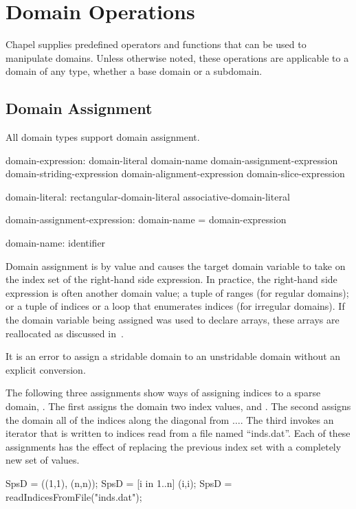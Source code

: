 \section{Domain Operations}

Chapel supplies predefined operators and functions that can be used to manipulate
domains.  Unless otherwise noted, these operations are applicable to a domain of
any type, whether a base domain or a subdomain.

\subsection{Domain Assignment}
\label{Domain_Assignment}

All domain types support domain assignment.  

\begin{syntax}
domain-expression:
  domain-literal
  domain-name
  domain-assignment-expression
  domain-striding-expression
  domain-alignment-expression
  domain-slice-expression

domain-literal:
  rectangular-domain-literal
  associative-domain-literal

domain-assignment-expression:
  domain-name = domain-expression

domain-name:
  identifier
\end{syntax}

Domain assignment is by
value and causes the target domain variable to take on the index set
of the right-hand side expression.  In practice, the right-hand side
expression is often another domain value; a tuple of ranges (for
regular domains); or a tuple of indices or a loop that enumerates
indices (for irregular domains).  If the domain variable being
assigned was used to declare arrays, these arrays are reallocated as
discussed in~.

It is an error to assign a stridable domain to an unstridable domain
without an explicit conversion.

\begin{example}
The following three assignments show ways of assigning indices to a
sparse domain, .  The first assigns the domain two index
values,  and .  The second assigns the domain
all of the indices along the diagonal from
$\ldots$.  The third invokes an iterator that
is written to  indices read from a file named
``inds.dat''.  Each of these assignments has the effect of replacing
the previous index set with a completely new set of values.
\begin{chapel}
SpsD = ((1,1), (n,n));
SpsD = [i in 1..n] (i,i);
SpsD = readIndicesFromFile("inds.dat");
\end{chapel}
\end{example}

